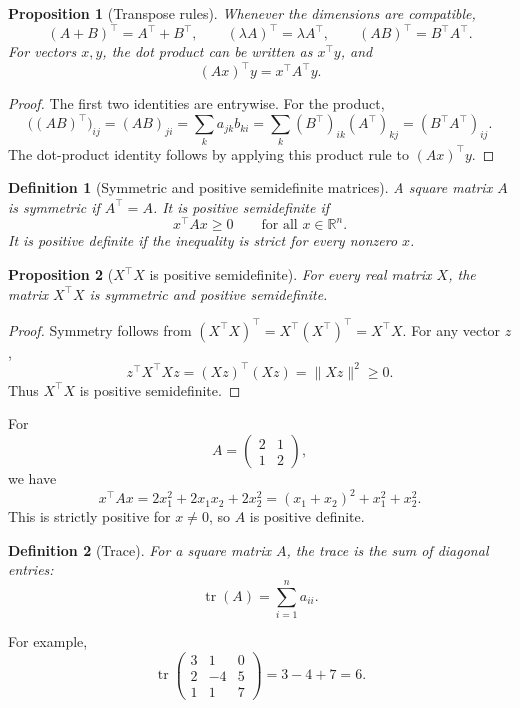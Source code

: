 \documentclass[10pt]{article}
\theoremstyle{compactdefinition}
\newtheorem{definition}{Definition}[section]
\theoremstyle{compactproposition}
\newtheorem{proposition}{Proposition}[section]
\newcommand{\R}{\mathbb{R}}
\newcommand{\tr}{\operatorname{tr}}
\begin{document}
\begin{proposition}[Transpose rules]
Whenever the dimensions are compatible,
\[
(A+B)^\top=A^\top+B^\top,\qquad
(\lambda A)^\top=\lambda A^\top,\qquad
(AB)^\top=B^\top A^\top.
\]
For vectors $x,y$, the dot product can be written as $x^\top y$, and
\[
(Ax)^\top y=x^\top A^\top y.
\]
\end{proposition}

\begin{proof}
The first two identities are entrywise. For the product,
\[
\bigl((AB)^\top\bigr)_{ij}=(AB)_{ji}
=\sum_k a_{jk}b_{ki}
=\sum_k (B^\top)_{ik}(A^\top)_{kj}
=(B^\top A^\top)_{ij}.
\]
The dot-product identity follows by applying this product rule to $(Ax)^\top y$.
\end{proof}

\begin{definition}[Symmetric and positive semidefinite matrices]
A square matrix $A$ is symmetric if $A^\top=A$. It is positive semidefinite if
\[
x^\top A x\ge 0
\qquad\text{for all }x\in\R^n.
\]
It is positive definite if the inequality is strict for every nonzero $x$.
\end{definition}

\begin{proposition}[$X^\top X$ is positive semidefinite]
For every real matrix $X$, the matrix $X^\top X$ is symmetric and positive
semidefinite.
\end{proposition}

\begin{proof}
Symmetry follows from $(X^\top X)^\top=X^\top(X^\top)^\top=X^\top X$. For any
vector $z$,
\[
z^\top X^\top Xz=(Xz)^\top(Xz)=\|Xz\|^2\ge0.
\]
Thus $X^\top X$ is positive semidefinite.
\end{proof}

For
\[
A=
\begin{pmatrix}
2&1\\
1&2
\end{pmatrix},
\]
we have
\[
x^\top Ax=2x_1^2+2x_1x_2+2x_2^2
=(x_1+x_2)^2+x_1^2+x_2^2.
\]
This is strictly positive for $x\neq0$, so $A$ is positive definite.

\begin{definition}[Trace]
For a square matrix $A$, the trace is the sum of diagonal entries:
\[
\tr(A)=\sum_{i=1}^n a_{ii}.
\]
\end{definition}

For example,
\[
\tr
\begin{pmatrix}
3&1&0\\
2&-4&5\\
1&1&7
\end{pmatrix}
=3-4+7=6.
\]
\end{document}
